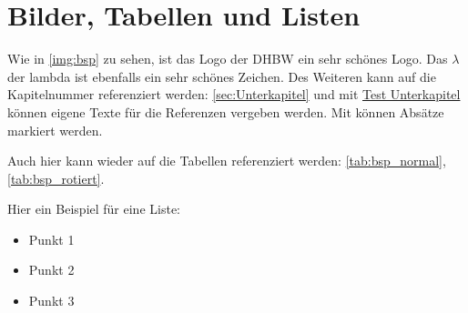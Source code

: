 \section{Bilder, Tabellen und Listen}


Wie in \autoref{img:bsp} zu sehen, ist das Logo der \ac{DHBW} ein sehr schönes Logo. Das $\lambda$ der \ac{lambda} ist ebenfalls ein sehr schönes Zeichen. Des Weiteren kann auf die Kapitelnummer referenziert werden: \autoref{sec:Unterkapitel} und mit \hyperref[sec:Unterkapitel]{Test Unterkapitel} können eigene Texte für die Referenzen vergeben werden. Mit  können Absätze markiert werden.


\vspace{0.5cm}

Auch hier kann wieder auf die Tabellen referenziert werden: \autoref{tab:bsp_normal}, \autoref{tab:bsp_rotiert}.


\newpage
{}

Hier ein Beispiel für eine Liste:
\begin{itemize}[label=\textbullet]
    \item Punkt 1
    \item Punkt 2
    \item Punkt 3
\end{itemize}